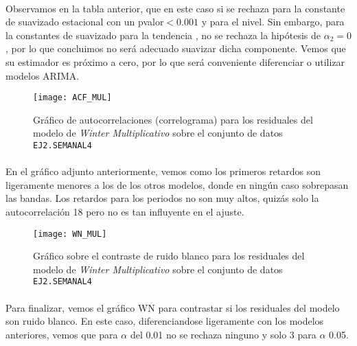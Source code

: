 \documentclass[a4paper, spanish]{article}
\begin{document}
      \paragraph{}
      Observamos en la tabla anterior, que en este caso si se rechaza para la constante de suavizado estacional con un pvalor$ <0.001$ y para el nivel. Sin embargo, para la constantes de suavizado para la tendencia , no se rechaza la hipótesis de $\alpha_2 =0$, por lo que concluimos no será adecuado suavizar dicha componente. Vemos que su estimador es próximo a cero, por lo que será conveniente diferenciar o utilizar modelos ARIMA.

      \begin{figure}[htb!]
        \centering
        \texttt{[image: ACF\_MUL]}
        \caption{Gráfico de autocorrelaciones (correlograma) para los residuales del modelo de \emph{Winter Multiplicativo} sobre el conjunto de datos \texttt{EJ2.SEMANAL4}}
        \label{img:b_winter_multiplicative_residuals_correlogram}
      \end{figure}

      \paragraph{}
      En el gráfico adjunto anteriormente, vemos como los primeros retardos son ligeramente menores a los de los otros modelos, donde en ningún caso sobrepasan las bandas. Los retardos para los periodos no son muy altos, quizás solo la autocorrelación 18 pero no es tan influyente en el ajuste.

      \begin{figure}[htb!]
        \centering
        \texttt{[image: WN\_MUL]}
        \caption{Gráfico sobre el contraste de ruido blanco para los residuales del modelo de \emph{Winter Multiplicativo} sobre el conjunto de datos \texttt{EJ2.SEMANAL4}}
        \label{img:b_winter_multplicative_test_white_noise}
      \end{figure}

      \paragraph{}
      Para finalizar, vemos el gráfico WN para contrastar si los residuales del modelo son ruido blanco. En este caso, diferenciandose ligeramente con los modelos anteriores, vemos que para $\alpha$ del 0.01 no se rechaza ninguno y solo 3 para $\alpha$ 0.05.
\end{document}
